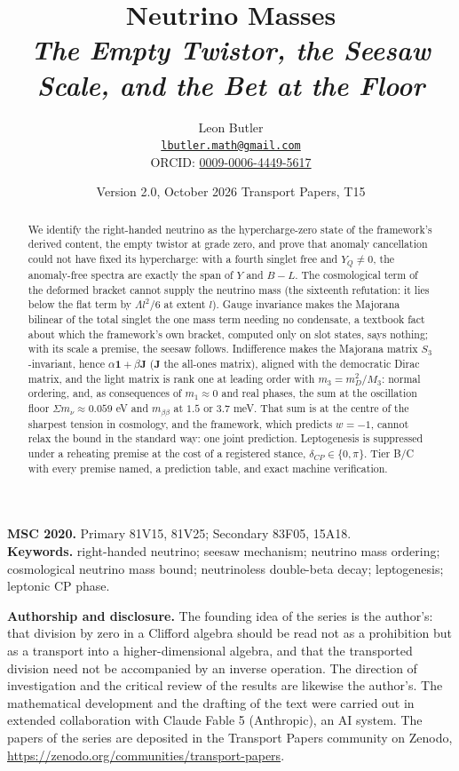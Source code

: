 \documentclass[11pt]{article}
\title{\bfseries Neutrino Masses\\[4pt]
  \large\itshape The Empty Twistor, the Seesaw Scale, and the Bet at the Floor}
\author{Leon Butler\\ \normalsize\href{mailto:lbutler.math@gmail.com}{\texttt{lbutler.math@gmail.com}}\\ \normalsize ORCID: \href{https://orcid.org/0009-0006-4449-5617}{0009-0006-4449-5617}}
\date{Version 2.0, October 2026 \textperiodcentered{} Transport Papers, T15}
\theoremstyle{definition}
\newcommand{\mnu}{\Sigma m_{\nu}}
\newcommand{\J}{\mathbf{J}}
\begin{document}
\maketitle

\begin{abstract}
\normalsize
We identify the right-handed neutrino as the hypercharge-zero state of the framework's derived content, the empty twistor at grade zero, and prove that anomaly cancellation could not have fixed its hypercharge: with a fourth singlet free and $Y_{Q} \neq 0$, the anomaly-free spectra are exactly the span of $Y$ and $B - L$. The cosmological term of the deformed bracket cannot supply the neutrino mass (the sixteenth refutation: it lies below the flat term by $\Lambda l^{2}/6$ at extent $l$). Gauge invariance makes the Majorana bilinear of the total singlet the one mass term needing no condensate, a textbook fact about which the framework's own bracket, computed only on slot states, says nothing; with its scale a premise, the seesaw follows. Indifference makes the Majorana matrix $S_{3}$-invariant, hence $\alpha\mathbf{1} + \beta\J$ ($\J$ the all-ones matrix), aligned with the democratic Dirac matrix, and the light matrix is rank one at leading order with $m_{3} = m_{D}^{2}/M_{3}$: normal ordering, and, as consequences of $m_{1} \approx 0$ and real phases, the sum at the oscillation floor $\mnu \approx 0.059$ eV and $m_{\beta\beta}$ at $1.5$ or $3.7$ meV. That sum is at the centre of the sharpest tension in cosmology, and the framework, which predicts $w = -1$, cannot relax the bound in the standard way: one joint prediction. Leptogenesis is suppressed under a reheating premise at the cost of a registered stance, $\delta_{CP} \in \{0, \pi\}$. Tier B/C with every premise named, a prediction table, and exact machine verification.
\end{abstract}

\medskip
\noindent\textbf{MSC 2020.} Primary 81V15, 81V25; Secondary 83F05, 15A18.\\
\textbf{Keywords.} right-handed neutrino; seesaw mechanism; neutrino mass ordering; cosmological neutrino mass bound; neutrinoless double-beta decay; leptogenesis; leptonic CP phase.

\newpage
\textbf{Authorship and disclosure. }The founding idea of the series is the author's: that division by zero in a Clifford algebra should be read not as a prohibition but as a transport into a higher-dimensional algebra, and that the transported division need not be accompanied by an inverse operation. The direction of investigation and the critical review of the results are likewise the author's. The mathematical development and the drafting of the text were carried out in extended collaboration with Claude Fable 5 (Anthropic), an AI system. The papers of the series are deposited in the Transport Papers community on Zenodo, \url{https://zenodo.org/communities/transport-papers}.
\end{document}
